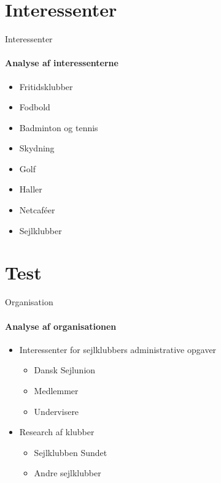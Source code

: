 \section{Interessenter}
\begin{frame}{Interessenter}
	\framesubtitle{Analyse af interessenterne}
	
	\begin{itemize}
		\item Fritidsklubber
		\item Fodbold
		\item Badminton og tennis
		\item Skydning
		\item Golf
		\item Haller
		\item Netcaféer
		\item Sejlklubber
	\end{itemize}


\end{frame}

\section{Test}
\begin{frame}{Organisation}
	\framesubtitle{Analyse af organisationen}
		\begin{itemize}
			\item Interessenter for sejlklubbers administrative opgaver
			\begin{itemize}
				\item Dansk Sejlunion
				\item Medlemmer
				\item Undervisere
			\end{itemize}
			\item Research af klubber
			\begin{itemize}
				\item Sejlklubben Sundet
				\item Andre sejlklubber
			\end{itemize}
		\end{itemize}

\end{frame}
